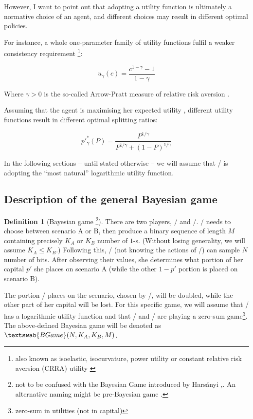\documentclass{article}
\theoremstyle{definition}
\newtheorem{definition}{Definition}[section]
\newcommand{\BG}[1]{$\textswab{BGame}(#1)$}
\begin{document}
However, I want to point out that adopting a utility function is ultimately a normative choice of an agent, and different choices may result in different optimal policies.

For instance, a whole one-parameter family of utility functions fulfil a weaker consistency requirement \footnote{also known as isoelastic, isocurvature, power utility \cite{book:EconomicsDictionary} or constant relative risk aversion (CRRA) utility \cite{book:Arrow, paper:Pratt}}:

\begin{equation}
\label{eq:ugamma}
    u_\gamma(c) = \frac{c^{1-\gamma}-1}{1-\gamma}
\end{equation}

Where $\gamma > 0$ is the so-called Arrow-Pratt measure of relative risk aversion \cite{book:MathematicsForEconomists, book:EconomicsDictionary}. 

Assuming that the agent is maximising her expected utility \cite{plato:ExpectedUtility}, different utility functions result in different optimal splitting ratios:

\begin{equation}
    p'^*_\gamma(P) = \frac{P^{1/\gamma}}{P^{1/\gamma}+(1-P)^{1/\gamma}}
\end{equation}

In the following sections -- until stated otherwise -- we will assume that \PI/ is adopting the ``most natural'' logarithmic utility function.

\subsection{Description of the general Bayesian game}
\label{def:BayesianGame}

\begin{definition}[Bayesian game \footnote{not to be confused with the Bayesian Game introduced by Harsányi \cite{paper:Harsanyi_I,paper:Harsanyi_II,paper:Harsanyi_III},\cite{paper:ZamirBayesianGames}. An alternative naming might be pre-Bayesian game \cite{book:EssentialGameTheory}.}]

There are two players, \PI/ and \PII/.
\PII/ needs to choose between scenario A or B, then produce a binary sequence of length $M$ containing precisely $K_A$ or $K_B$ number of $1$-s. (Without losing generality, we will assume $K_A \le K_B$.)
Following this, \PI/ (not knowing the actions of \PII/) can sample $N$ number of bits. After observing their values, she determines what portion of her capital $p'$ she places on scenario A (while the other $1-p'$ portion is placed on scenario B).

The portion \PI/ places on the scenario, chosen by \PII/, will be doubled, while the other part of her capital will be lost.
For this specific game, we will assume that \PI/ has a logarithmic utility function and that \PI/ and \PII/ are playing a zero-sum game\footnote{zero-sum in utilities (not in capital)}.
The above-defined Bayesian game will be denoted as 
\BG{N, K_A, K_B, M}.

\end{definition}
\end{document}
